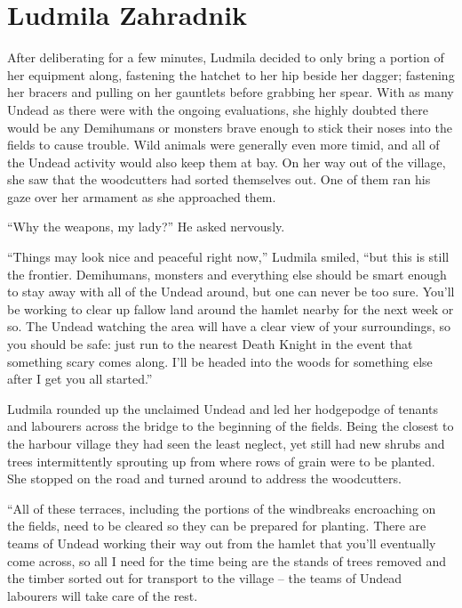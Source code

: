 \chapter{Ludmila Zahradnik}

After deliberating for a few minutes, Ludmila decided to only bring a portion of her equipment along, fastening the hatchet to her hip beside her dagger; fastening her bracers and pulling on her gauntlets before grabbing her spear. With as many Undead as there were with the ongoing evaluations, she highly doubted there would be any Demihumans or monsters brave enough to stick their noses into the fields to cause trouble. Wild animals were generally even more timid, and all of the Undead activity would also keep them at bay. On her way out of the village, she saw that the woodcutters had sorted themselves out. One of them ran his gaze over her armament as she approached them.

 

“Why the weapons, my lady?” He asked nervously.

 

“Things may look nice and peaceful right now,” Ludmila smiled, “but this is still the frontier. Demihumans, monsters and everything else should be smart enough to stay away with all of the Undead around, but one can never be too sure. You’ll be working to clear up fallow land around the hamlet nearby for the next week or so. The Undead watching the area will have a clear view of your surroundings, so you should be safe: just run to the nearest Death Knight in the event that something scary comes along. I’ll be headed into the woods for something else after I get you all started.”

 

Ludmila rounded up the unclaimed Undead and led her hodgepodge of tenants and labourers across the bridge to the beginning of the fields. Being the closest to the harbour village they had seen the least neglect, yet still had new shrubs and trees intermittently sprouting up from where rows of grain were to be planted. She stopped on the road and turned around to address the woodcutters.

 

“All of these terraces, including the portions of the windbreaks encroaching on the fields, need to be cleared so they can be prepared for planting. There are teams of Undead working their way out from the hamlet that you’ll eventually come across, so all I need for the time being are the stands of trees removed and the timber sorted out for transport to the village – the teams of Undead labourers will take care of the rest.

